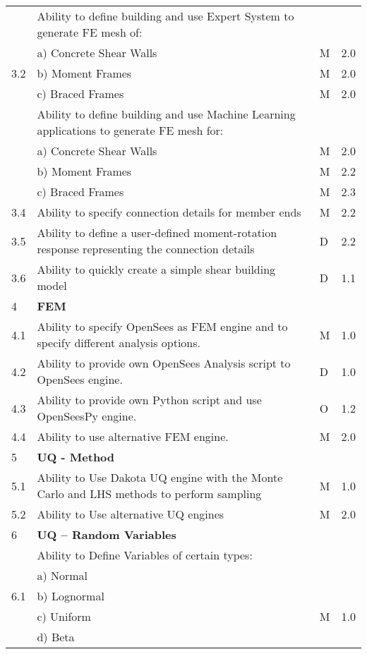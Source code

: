 \begin{longtable}{| p{} | p{} | p{} | p{} |}
	\multirow{5}{*}{3.2}  & Ability to define building and use Expert System to generate FE mesh of: &  &  \\
	 & a)     Concrete Shear Walls & M & 2.0 \\ 
	 & b)     Moment Frames & M & 2.0 \\ 
	 & c)     Braced Frames & M & 2.0  \\ \hline
	\multirow{5}{*}{3.3} & Ability to define building and use Machine Learning applications to generate FE mesh for: &  &  \\ 
	 & a)     Concrete Shear Walls & M & 2.0 \\ 
	 & b)     Moment Frames & M & 2.2 \\ 
	 & c)     Braced Frames & M & 2.3  \\ \hline
	3.4 & Ability to specify connection details for member ends & M & 2.2 \\ \hline
	3.5 & Ability to define a user-defined moment-rotation response representing the connection details & D & 2.2 \\ \hline
	3.6 & Ability to quickly create a simple shear building model & D & 1.1 \\ \hline
	4 & \textbf{FEM} &  &  \\ \hline
	4.1 & Ability to specify OpenSees as FEM engine and to specify different analysis options. & M & 1.0 \\ \hline
	4.2 & Ability to provide own OpenSees Analysis script to OpenSees engine. & D & 1.0 \\ \hline
	4.3 & Ability to provide own Python script and use OpenSeesPy engine. & O & 1.2 \\ \hline
	4.4 & Ability to use alternative FEM engine. & M & 2.0 \\ \hline
	5 & \textbf{UQ - Method} &  &  \\ \hline
	5.1 & Ability to Use Dakota UQ engine with the Monte Carlo and LHS methods to perform sampling & M & 1.0 \\ \hline
	5.2 & Ability to Use alternative UQ engines & M & 2.0 \\ \hline
    6 & \textbf{UQ – Random Variables} &  &  \\ \hline
	\multirow{5}{*}{6.1} & Ability to Define Variables of certain types: &  &  \\ 
	 & a)     Normal &  &  \\ 
	 & b)     Lognormal &  &  \\ 
	 & c)     Uniform & M  & 1.0 \\ 
	 & d)     Beta &  &  \\ 

\end{longtable}

